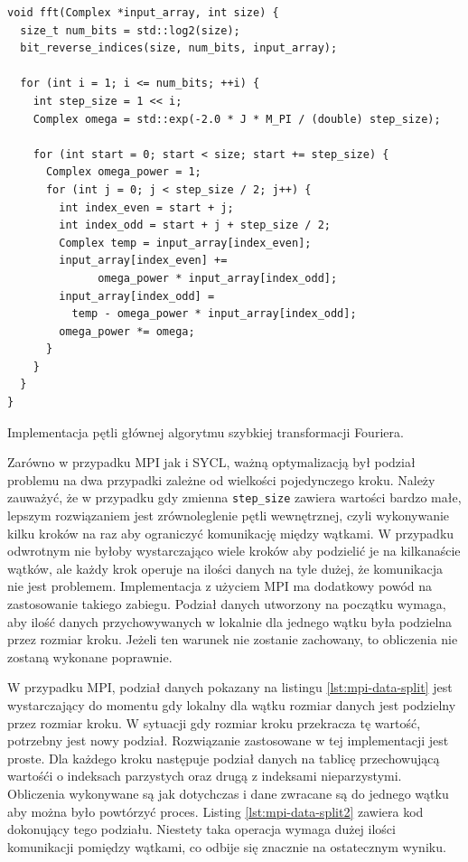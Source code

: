\documentclass[a4paper,12pt]{book} %
\begin{document}
\begin{lstfloat}
\lstset{language=C++}
\begin{lstlisting}[frame=single]
void fft(Complex *input_array, int size) {
  size_t num_bits = std::log2(size);
  bit_reverse_indices(size, num_bits, input_array);

  for (int i = 1; i <= num_bits; ++i) {
    int step_size = 1 << i;
    Complex omega = std::exp(-2.0 * J * M_PI / (double) step_size);

    for (int start = 0; start < size; start += step_size) {
      Complex omega_power = 1;
      for (int j = 0; j < step_size / 2; j++) {
        int index_even = start + j;
        int index_odd = start + j + step_size / 2;
        Complex temp = input_array[index_even];
        input_array[index_even] += 
        	  omega_power * input_array[index_odd];
        input_array[index_odd] = 
          temp - omega_power * input_array[index_odd];
        omega_power *= omega;
      }
    }
  }
}

\end{lstlisting}
\caption{Implementacja pętli głównej algorytmu szybkiej transformacji Fouriera.}
\label{lst:fft-seq}
\end{lstfloat}

Zarówno w przypadku MPI jak i SYCL, ważną optymalizacją był podział problemu na dwa przypadki zależne od wielkości pojedynczego kroku. Należy zauważyć, że w przypadku gdy zmienna \texttt{step\_size} zawiera wartości bardzo małe, lepszym rozwiązaniem jest zrównoleglenie pętli wewnętrznej, czyli wykonywanie kilku kroków na raz aby ograniczyć komunikację między wątkami. W przypadku odwrotnym nie byłoby wystarczająco wiele kroków aby podzielić je na kilkanaście wątków, ale każdy krok operuje na ilości danych na tyle dużej, że komunikacja nie jest problemem. Implementacja z użyciem MPI ma dodatkowy powód na zastosowanie takiego zabiegu. Podział danych utworzony na początku wymaga, aby ilość danych przychowywanych w lokalnie dla jednego wątku była podzielna przez rozmiar kroku. Jeżeli ten warunek nie zostanie zachowany, to obliczenia nie zostaną wykonane poprawnie.

W przypadku MPI, podział danych pokazany na listingu \ref{lst:mpi-data-split} jest wystarczający do momentu gdy lokalny dla wątku rozmiar danych jest podzielny przez rozmiar kroku. W sytuacji gdy rozmiar kroku przekracza tę wartość, potrzebny jest nowy podział. Rozwiązanie zastosowane w tej implementacji jest proste. Dla każdego kroku następuje podział danych na tablicę przechowującą wartośći o indeksach  parzystych oraz drugą z indeksami nieparzystymi. Obliczenia wykonywane są jak dotychczas i dane zwracane są do jednego wątku aby można było powtórzyć proces. Listing \ref{lst:mpi-data-split2} zawiera kod dokonujący tego podziału. Niestety taka operacja wymaga dużej ilości komunikacji pomiędzy wątkami, co odbije się znacznie na ostatecznym wyniku.
\end{document}
